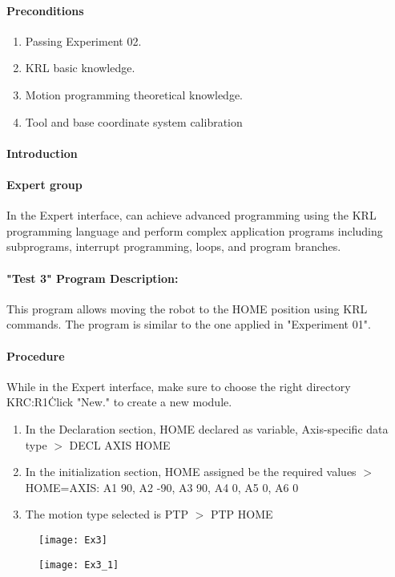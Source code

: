 \documentclass[]{book}
\begin{document}
\paragraph{Preconditions}
\begin{enumerate}
	\item Passing Experiment 02.
	\item KRL basic knowledge.
	\item Motion programming theoretical knowledge. 
	\item Tool and base coordinate system calibration
\end{enumerate}
\paragraph{Introduction}
\paragraph{Expert group}
In the Expert interface, can achieve advanced programming using the KRL programming language and perform complex application programs including subprograms, interrupt programming, loops, and program branches. 
\paragraph{"Test 3" Program Description:}
This program allows moving the robot to the HOME position using KRL commands. The program is similar to the one applied in "Experiment 01".
\paragraph{Procedure}
While in the Expert interface, make sure to choose the right directory KRC:R1\.Click "New." to create a new module. 
\begin{enumerate}
	\item In the Declaration section, HOME declared as variable, Axis-specific data type $>$ DECL AXIS HOME
	\item In the initialization section, HOME assigned be the required values $>$ HOME={AXIS: A1 90, A2 -90, A3 90, A4 0, A5 0, A6 0}
	\item The motion type selected is PTP $>$ PTP HOME
\end{enumerate}
\newpage
\begin{figure}[H]
	\texttt{[image: Ex3]}
	\centering
\end{figure}
\begin{figure}[H]
	\texttt{[image: Ex3\_1]}
	\centering
\end{figure}
\newpage
\end{document}
